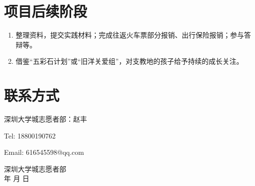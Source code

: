 \documentclass[12pt]{ctexart}
\begin{document}
\section{项目后续阶段}
\begin{enumerate}
\item 整理资料，提交实践材料；完成往返火车票部分报销、出行保险报销；参与答辩等。
\item 借鉴“五彩石计划”或“旧洋关爱组”，对支教地的孩子给予持续的成长关注。
\end{enumerate}
\section{联系方式}
深圳大学城志愿者部：赵丰

Tel: 18800190762

Email: 616545598@qq.com

\begin{flushright}
深圳大学城志愿者部\\
\the\year 年 \the\month 月 \the\day 日
\end{flushright}
\end{document}

